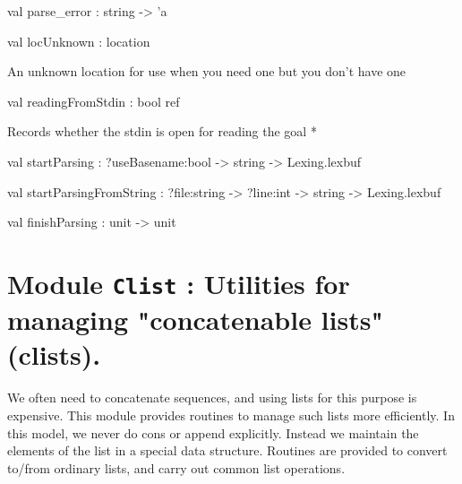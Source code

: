 \documentclass[11pt]{article}
\begin{document}
\label{val:Errormsg.parse-underscoreerror}\begin{ocamldoccode}
val parse_error : string -> 'a
\end{ocamldoccode}




\label{val:Errormsg.locUnknown}\begin{ocamldoccode}
val locUnknown : location
\end{ocamldoccode}
\begin{ocamldocdescription}
An unknown location for use when you need one but you don't have one


\end{ocamldocdescription}




\label{val:Errormsg.readingFromStdin}\begin{ocamldoccode}
val readingFromStdin : bool ref
\end{ocamldoccode}
\begin{ocamldocdescription}
Records whether the stdin is open for reading the goal *


\end{ocamldocdescription}




\label{val:Errormsg.startParsing}\begin{ocamldoccode}
val startParsing : ?useBasename:bool -> string -> Lexing.lexbuf
\end{ocamldoccode}




\label{val:Errormsg.startParsingFromString}\begin{ocamldoccode}
val startParsingFromString :
  ?file:string -> ?line:int -> string -> Lexing.lexbuf
\end{ocamldoccode}




\label{val:Errormsg.finishParsing}\begin{ocamldoccode}
val finishParsing : unit -> unit
\end{ocamldoccode}


\section{Module {\tt{Clist}} : Utilities for managing "concatenable lists" (clists).}
\label{module:Clist}
 We often need to
    concatenate sequences, and using lists for this purpose is expensive. This
    module provides routines to manage such lists more efficiently. In this
    model, we never do cons or append explicitly. Instead we maintain
    the elements of the list in a special data structure. Routines are provided
    to convert to/from ordinary lists, and carry out common list operations.
\end{document}
